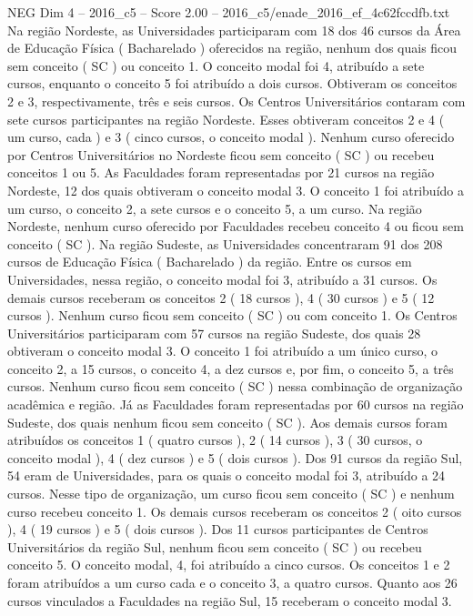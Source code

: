 \begin{textsample}{NEG Dim 4 – 2016\_c5 – Score 2.00 – 2016\_c5/enade\_2016\_ef\_4c62fccdfb.txt}
Na região Nordeste, as Universidades participaram com 18 dos 46 cursos da Área de Educação Física ( Bacharelado ) oferecidos na região, nenhum dos quais ficou sem conceito ( SC ) ou conceito 1.
O conceito modal foi 4, atribuído a sete cursos, enquanto o conceito 5 foi atribuído a dois cursos.
Obtiveram os conceitos 2 e 3, respectivamente, três e seis cursos.
Os Centros Universitários contaram com sete cursos participantes na região Nordeste.
Esses obtiveram conceitos 2 e 4 ( um curso, cada ) e 3 ( cinco cursos, o conceito modal ).
Nenhum curso oferecido por Centros Universitários no Nordeste ficou sem conceito ( SC ) ou recebeu conceitos 1 ou 5.
As Faculdades foram representadas por 21 cursos na região Nordeste, 12 dos quais obtiveram o conceito modal 3.
O conceito 1 foi atribuído a um curso, o conceito 2, a sete cursos e o conceito 5, a um curso.
Na região Nordeste, nenhum curso oferecido por Faculdades recebeu conceito 4 ou ficou sem conceito ( SC ).
Na região Sudeste, as Universidades concentraram 91 dos 208 cursos de Educação Física ( Bacharelado ) da região.
Entre os cursos em Universidades, nessa região, o conceito modal foi 3, atribuído a 31 cursos.
Os demais cursos receberam os conceitos 2 ( 18 cursos ), 4 ( 30 cursos ) e 5 ( 12 cursos ).
Nenhum curso ficou sem conceito ( SC ) ou com conceito 1.
Os Centros Universitários participaram com 57 cursos na região Sudeste, dos quais 28 obtiveram o conceito modal 3.
O conceito 1 foi atribuído a um único curso, o conceito 2, a 15 cursos, o conceito 4, a dez cursos e, por fim, o conceito 5, a três cursos.
Nenhum curso ficou sem conceito ( SC ) nessa combinação de organização acadêmica e região.
Já as Faculdades foram representadas por 60 cursos na região Sudeste, dos quais nenhum ficou sem conceito ( SC ).
Aos demais cursos foram atribuídos os conceitos 1 ( quatro cursos ), 2 ( 14 cursos ), 3 ( 30 cursos, o conceito modal ), 4 ( dez cursos ) e 5 ( dois cursos ).
Dos 91 cursos da região Sul, 54 eram de Universidades, para os quais o conceito modal foi 3, atribuído a 24 cursos.
Nesse tipo de organização, um curso ficou sem conceito ( SC ) e nenhum curso recebeu conceito 1.
Os demais cursos receberam os conceitos 2 ( oito cursos ), 4 ( 19 cursos ) e 5 ( dois cursos ).
Dos 11 cursos participantes de Centros Universitários da região Sul, nenhum ficou sem conceito ( SC ) ou recebeu conceito 5.
O conceito modal, 4, foi atribuído a cinco cursos.
Os conceitos 1 e 2 foram atribuídos a um curso cada e o conceito 3, a quatro cursos.
Quanto aos 26 cursos vinculados a Faculdades na região Sul, 15 receberam o conceito modal 3.

\end{textsample}
